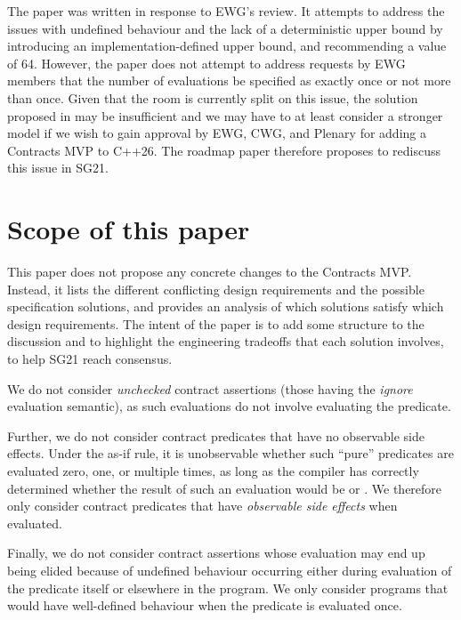 The paper \cite{P3119R0} was written in response to EWG's review. It attempts to address the issues with undefined behaviour and the lack of a deterministic upper bound by introducing an implementation-defined upper bound, and recommending a value of 64. However, the paper does not attempt to address requests by EWG members that the number of evaluations be specified as exactly once or not more than once. Given that the room is currently split on this issue, the solution proposed in \cite{P3119R0} may be insufficient and we may have to at least consider a stronger model if we wish to gain approval by EWG, CWG, and Plenary for adding a Contracts MVP to C++26. The roadmap paper \cite{D3197R0} therefore proposes to rediscuss this issue in SG21.


\section{Scope of this paper}

This paper does not propose any concrete changes to the Contracts MVP. Instead, it lists the different conflicting design requirements and the possible specification solutions, and provides an analysis of which solutions satisfy which design requirements. The intent of the paper is to add some structure to the discussion and to highlight the engineering tradeoffs that each solution involves, to help SG21 reach consensus.

We do not consider \emph{unchecked} contract assertions (those having the \emph{ignore} evaluation semantic), as such evaluations do not involve evaluating the predicate.

Further, we do not consider contract predicates that have no observable side effects. Under the as-if rule, it is unobservable whether such ``pure'' predicates are evaluated zero, one, or multiple times, as long as the compiler has correctly determined whether the result of such an evaluation would be  or . We therefore only consider contract predicates that have \emph{observable side effects} when evaluated. 

Finally, we do not consider contract assertions whose evaluation may end up being elided because of undefined behaviour occurring either during evaluation of the predicate itself or elsewhere in the program. We only consider programs that would have well-defined behaviour when the predicate is evaluated once.



